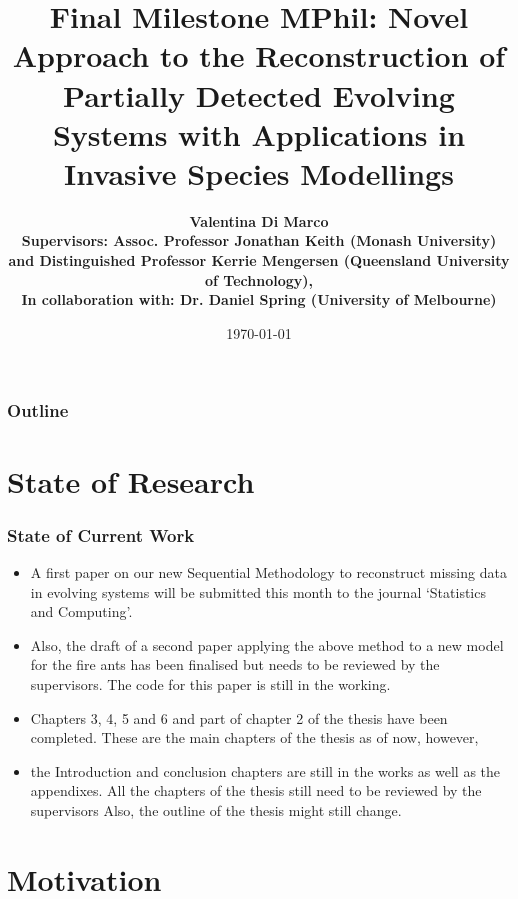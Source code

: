 \documentclass[9pt, xcolor={dvipsnames,svgnames,table}]{beamer}
\title{Final Milestone MPhil: Novel Approach to the Reconstruction of Partially Detected Evolving Systems with Applications in Invasive Species Modellings}
\author[Valentina Di Marco]{\textbf {Valentina Di Marco\\ \footnotesize Supervisors: Assoc. Professor Jonathan Keith (Monash University) and Distinguished Professor Kerrie Mengersen (Queensland University of Technology), \\ \footnotesize In collaboration with: Dr. Daniel Spring (University of Melbourne)}}
\date{\today}
\begin{document}
\begin{frame}
    \titlepage
\end{frame}

\begin{frame}
    \frametitle{Outline}
    \tableofcontents
\end{frame}






\section{State of Research}

\begin{frame}
\frametitle{State of Current Work}
    \begin{itemize}
    \setlength\itemsep{1em}
        \item A first paper on our new Sequential Methodology to reconstruct missing data in evolving systems will be submitted this month to the journal `Statistics and Computing'.
        \item Also, the draft of a second paper applying the above method to a new model for the fire ants has been finalised but needs to be reviewed by the supervisors. The code for this paper is still in the working.
        \item Chapters 3, 4, 5 and 6 and part of chapter 2 of the thesis have been completed. These are the main chapters of the thesis as of now, however,
        \item the Introduction and conclusion chapters are still in the works as well as the appendixes. All the chapters of the thesis still need to be reviewed by the supervisors Also, the outline of the thesis might still change.
    \end{itemize}
\end{frame}





\section{Motivation}
\end{document}
